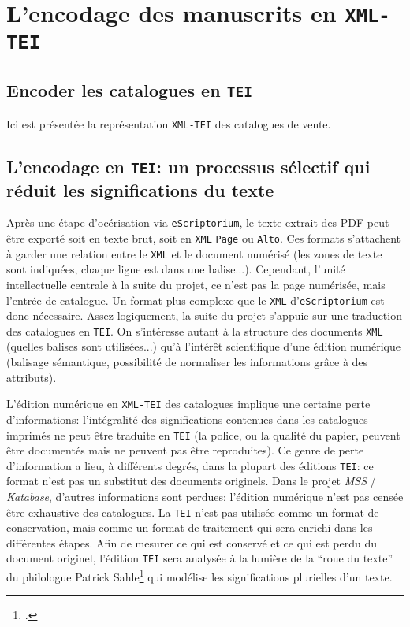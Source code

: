 \documentclass[a4paper, 12pt, twoside]{book}
\newcommand{\alto}{\texttt{Alto}}
\newcommand{\escr}{\texttt{eScriptorium}}
\newcommand{\ktb}{\textit{Katabase}}
\newcommand{\mss}{\textit{MSS}}
\newcommand{\mssktb}{\mss{} / \ktb{}}
\newcommand{\tei}{\texttt{TEI}}
\newcommand{\xml}{\texttt{XML}}
\newcommand{\xmltei}{\texttt{XML-TEI}}
\begin{document}
\section{L'encodage des manuscrits en \xmltei{}}
\subsection{Encoder les catalogues en \tei{}}
Ici est présentée la représentation \xmltei{} des catalogues de vente.

\subsection{L'encodage en \tei{}: un processus sélectif qui réduit les significations du texte}
Après une étape d'océrisation via \escr{}, le texte extrait des PDF peut être exporté soit en texte brut, soit en \xml{} \texttt{Page} ou \alto{}. Ces formats s'attachent à garder une relation entre le \xml{} et le document numérisé (les zones de texte sont indiquées, chaque ligne est dans une balise...). Cependant, l'unité intellectuelle centrale à la suite du projet, ce n'est pas la page numérisée, mais l'entrée de catalogue. Un format plus complexe que le \xml{} d'\escr{} est donc nécessaire. Assez logiquement, la suite du projet s'appuie sur une traduction des catalogues en \tei{}. On s'intéresse autant à la structure des documents \xml{} (quelles balises sont utilisées...) qu'à l'intérêt scientifique d'une édition numérique (balisage sémantique, possibilité de normaliser les informations grâce à des attributs).

L'édition numérique en \xmltei{} des catalogues implique une certaine perte d'informations: l'intégralité des significations contenues dans les catalogues imprimés ne peut être traduite en \tei{} (la police, ou la qualité du papier, peuvent être documentés mais ne peuvent pas être reproduites). Ce genre de perte d'information a lieu, à différents degrés, dans la plupart des éditions \tei{}: ce format n'est pas un substitut des documents originels. Dans le projet \mssktb{}, d'autres informations sont perdues: l'édition numérique n'est pas censée être exhaustive des catalogues. La \tei{} n'est pas utilisée comme un format de conservation, mais comme un format de traitement qui sera enrichi dans les différentes étapes. Afin de mesurer ce qui est conservé et ce qui est perdu du document originel, l'édition \tei{} sera analysée à la lumière de la \enquote{roue du texte} du philologue Patrick Sahle\footcite{sahle_digital_2016} qui modélise les significations plurielles d'un texte.
\end{document}
